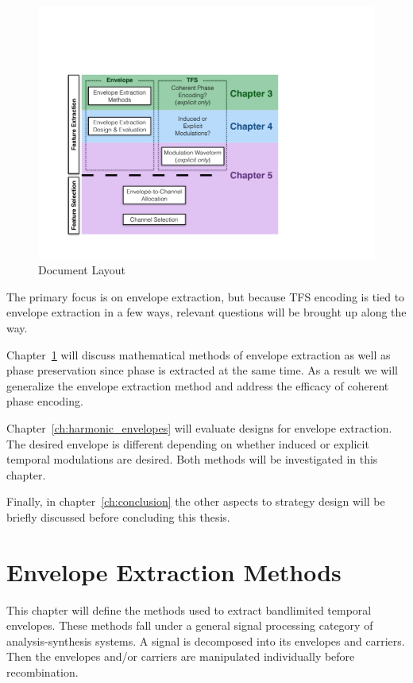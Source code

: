 \documentclass [11pt, proquest,oneside] {ganter_thesis}[2015/03/03]
\begin{document}
\begin{figure}[!ht]
  \centering
    \includegraphics[width=.7\textwidth]{document_layout}   
    \caption{Document Layout}\label{fig:document_layout}
\end{figure}

The primary focus is on envelope extraction, but because TFS encoding is tied to envelope extraction in a few ways, relevant questions will be brought up along the way.

Chapter~\ref{ch:envelope_extraction} will discuss mathematical methods of envelope extraction as well as phase preservation since phase is extracted at the same time.  As a result we will generalize the envelope extraction method and address the efficacy of coherent phase encoding.

Chapter~\ref{ch:harmonic_envelopes} will evaluate designs for envelope extraction.  The desired envelope is different depending on whether induced or explicit temporal modulations are desired.  Both methods will be investigated in this chapter.

Finally, in chapter~\ref{ch:conclusion} the other aspects to strategy design will be briefly discussed before concluding this thesis.



\chapter{Envelope Extraction Methods}\label{ch:envelope_extraction}

This chapter will define the methods used to extract bandlimited temporal envelopes.  These methods fall under a general signal processing category of analysis-synthesis systems.  A signal is decomposed into its envelopes and carriers.  Then the envelopes and/or carriers are manipulated individually before recombination. 
\end{document}
